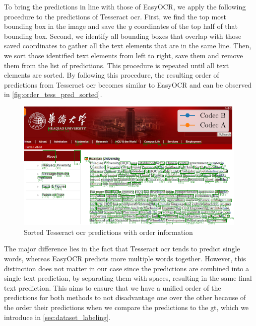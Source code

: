 To bring the predictions in line with those of EasyOCR, we apply the following procedure to the predictions of Tesseract \gls{ocr}.
First, we find the top most bounding box in the image and save the $y$ coordinates of the top half of that bounding box.
Second, we identify all bounding boxes that overlap with those saved coordinates to gather all the text elements that are in the same line.
Then, we sort those identified text elements from left to right, save them and remove them from the list of predictions.
This procedure is repeated until all text elements are sorted.
By following this procedure, the resulting order of predictions from Tesseract \gls{ocr} becomes similar to EasyOCR and can be observed in \autoref{fig:order_tess_pred_sorted}.
\begin{figure}[h!]
    \centering
    \includegraphics[width=\textwidth]{../images/bbox_order_tess_sorted.pdf}
    \caption{Sorted Tesseract \gls{ocr} predictions with order information}
    \label{fig:order_tess_pred_sorted}
\end{figure}
The major difference lies in the fact that Tesseract \gls{ocr} tends to predict single words, whereas EasyOCR predicts more multiple words together.
However, this distinction does not matter in our case since the predictions are combined into a single text prediction, by separating them with spaces, resulting in the same final text prediction.
This aims to ensure that we have a unified order of the predictions for both methods to not disadvantage one over the other because of the order their predictions when we compare the predictions to the \gls{gt}, which we introduce in \autoref{sec:dataset_labeling}.


